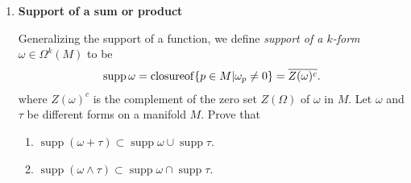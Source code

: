 \documentclass[12pt,a4paper]{report}
\newcommand{\BLUE}[1]{\textcolor{blue}{#1}}
\newcommand{\SUPP}{\operatorname{supp}}
\newcommand{\CLOSURE}{\operatorname{closure of}}
\begin{document}
\begin{enumerate}[label=18.\arabic*]
	\BLUE{The definition of pullback and wedge product are
	\begin{align*}
		(F^*\omega)_p(v_1,\dots,v_k) &= \omega_{F(p)}(dF_p(v_1),\dots, dF_p(v_k))\\		(\omega\wedge\tau)_p(u,v) &= \frac{1}{k!l!}\sum_{\sigma\in S_{k+l}} (\operatorname{sgn}(\sigma) \omega_p(u_{\sigma_1}, \dot, u_{\sigma_k})\tau_p(v_{\sigma_{k+1}},\dots,v_{\sigma_{k+l}})
	\end{align*}Thus starting with the left hand side, 
	\begin{align*}
		F^*(\omega\wedge\tau)(u,v) &= \PAREN{\omega\wedge\tau}_{F(p)}(dF_p(u_1),\dots,dF_p(u_k), dF_p(v_1),\dots, dF_p(v_k)) \\
		&= \frac{1}{k!l!}\sum_{\sigma \in S_{k+l}} \operatorname{sgn}(\sigma) \omega_{F(p)}(dF_p(u_{\sigma_1}),\dots,dF_p(u_{\sigma_k}))\tau_{F(p)}(dF_p(v_{\sigma_{k+1}}),\dots, dF_p(v_{\sigma_{k+l}})) 
	\end{align*}Now the right hand side
	\begin{align*}
		(F^*\omega)_p\wedge (F^*\tau)_p(u,v) &= \PAREN{ \omega_{F(p)}(dF_p(u_1),\dots, dF_p(u_k))}\wedge\PAREN{ \tau_{F(p)}(dF_p(v_1),\dots, dF_p(v_k))} \\
		&= \frac{1}{k!l!}\sum_{\sigma \in S_{k+l}} \operatorname{sgn}(\sigma) \omega_{F(p)}(dF_p(u_{\sigma_1}),\dots,dF_p(u_{\sigma_k}))\tau_{F(p)}(dF_p(v_{\sigma_{k+1}}),\dots, dF_p(v_{\sigma_{k+l}})) 
	\end{align*}
	}
	
	\item \textbf{Support of a sum or product}

	Generalizing the support of a function, we define \textit{support of a $k$-form} $\omega \in \Omega^k(M)$ to be
	\begin{align*}
		\SUPP \omega = \CLOSURE \{p\in M | \omega_p \ne 0\} = \CONJ{Z(\omega)^c}.
	\end{align*}where $Z(\omega)^c$ is the complement of the zero set $Z(\Omega)$ of $\omega$ in $M$.  Let $\omega$ and $\tau$ be different forms on a manifold $M$.  Prove that
	\begin{enumerate}[label=(\alph*)]
	
		\item $\SUPP(\omega+\tau) \subset \SUPP\omega \cup \SUPP \tau$.
		\item $\SUPP(\omega \wedge \tau) \subset \SUPP \omega \cap \SUPP \tau$.
	
	\end{enumerate}
	

\end{enumerate}
\end{document}
